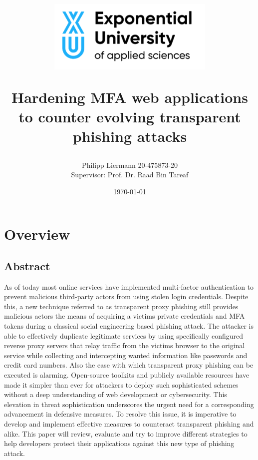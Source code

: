\documentclass[12pt]{scrbook}
\begin{document}
\author{Philipp Liermann 20-475873-20\\Supervisor: Prof. Dr. Raad Bin Tareaf}
\date{\today}

\title{ \begin{center} \includegraphics[width=8cm]{./images/logo.png}
	\end{center} \vspace{2cm} Hardening MFA web applications to counter evolving
	transparent phishing attacks \vspace{2cm} \large }

\maketitle

\newpage \tableofcontents

\newpage \chapter{Overview} \section{Abstract} As of today most online
services have implemented multi-factor authentication to prevent malicious
third-party actors from using stolen login credentials. Despite this, a new
technique referred to as transparent proxy phishing still provides malicious
actors the means of acquiring a victims private credentials and MFA tokens
during a classical social engineering based phishing attack. The attacker is
able to effectively duplicate legitimate services by using specifically
configured reverse proxy servers that relay traffic from the victims browser
to the original service while collecting and intercepting wanted information
like passwords and credit card numbers. Also the ease with which transparent
proxy phishing can be executed is alarming. Open-source toolkits and
publicly available resources have made it simpler than ever for attackers to
deploy such sophisticated schemes without a deep understanding of web
development or cybersecurity. This elevation in threat sophistication
underscores the urgent need for a corresponding advancement in defensive
measures. To resolve this issue, it is imperative to develop and implement
effective measures to counteract transparent phishing and alike. This paper
will review, evaluate and try to improve different strategies to help
developers protect their applications against this new type of phishing attack.
\end{document}
